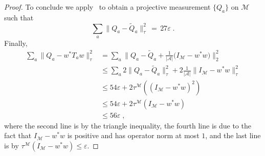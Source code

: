 \documentclass[11pt]{article}
\theoremstyle{definition}
\newcommand{\mA}{\ensuremath{\mathcal{A}}}
\newcommand{\mM}{\ensuremath{\mathcal{M}}}
\newcommand{\eps}{\varepsilon}
\begin{document}
\begin{proof}
To conclude we apply~\cite[Theorem 1.2]{de2021orthogonalization} to obtain a projective measurement $\{Q_a\}$ on $\mM$ such that 
\begin{equation*}
\sum_a \big\|{Q}_a - \tilde{Q}_a \big\|^2_\tau \,=\, 27\eps\;.
\end{equation*}
Finally,
\begin{align*}
\sum_a \big\|{Q}_a - w^*{T}_a w\big\|^2_\tau &= \sum_a \Big\|{Q}_a - \tilde{Q}_a  + \frac{1}{|\mA|}\big(I_\mM - w^* w\big) \Big\|^2_2\\
&\leq  \sum_a 2\big\|{Q}_a - \tilde{Q}_a\big\|_\tau^2  + 2\frac{1}{|\mA|}\big\|I_\mM - w^* w\big\|_\tau^2 \\
&\leq 54 \eps + 2 \tau^\mM( (I_\mM - w^* w)^2 ) \\
&\leq 54 \eps + 2 \tau^\mM(I_\mM - w^* w ) \\
&\leq 56 \eps\;,
\end{align*}
where the second line is by the triangle inequality, the fourth line is due to the fact that $I_\mM - w^* w$ is positive and has operator norm at most $1$, and the last line is by $\tau^\mM(I_\mM - w^* w ) \leq \eps$.
\end{proof}
\end{document}

